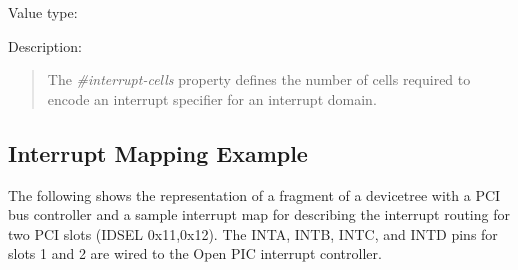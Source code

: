 \documentclass[a4paper,10pt,oneside]{sphinxmanual}
\begin{document}
Value type: 

Description:
\begin{quote}

The \emph{\#interrupt-cells} property defines the number of cells required to
encode an interrupt specifier for an interrupt domain.
\end{quote}


\subsection{Interrupt Mapping Example}
\label{devicetree-basics:interrupt-mapping-example}
The following shows the representation of a fragment of a devicetree with
a PCI bus controller and a sample interrupt map for describing the
interrupt routing for two PCI slots (IDSEL 0x11,0x12). The INTA, INTB,
INTC, and INTD pins for slots 1 and 2 are wired to the Open PIC
interrupt controller.
\label{devicetree-basics:example-interrupt-mapping}
\def\SphinxLiteralBlockLabel{\label{devicetree-basics:example-interrupt-mapping}}
\end{document}
